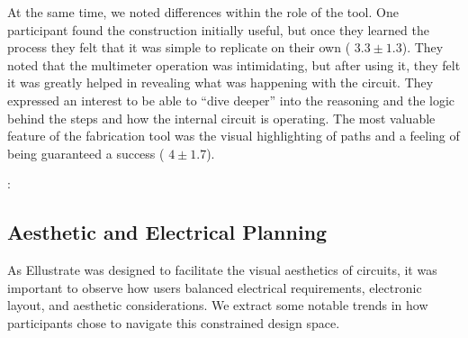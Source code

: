 \documentclass{sigchi}
\begin{document}
  At the same time, we noted differences within the role of the tool. One participant found the construction initially useful, but once they learned the process they felt that it was simple to replicate on their own ( $3.3 \pm 1.3$).   They noted that the multimeter operation was intimidating, but after using it, they felt it was greatly helped in revealing what was happening with the circuit. They expressed an interest to be able to ``dive deeper'' into the reasoning and the logic behind the steps and how the internal circuit is operating. The most valuable feature of the fabrication tool was the visual highlighting of paths and a feeling of being guaranteed a success ( $4 \pm 1.7$). 

  \begin{myquote}
   \vspace{-2pt}
    :
    \vspace{-2pt}
  \end{myquote}




% 
  

\subsection{Aesthetic and Electrical Planning}
  As Ellustrate was designed to facilitate the visual aesthetics of circuits, it was important to observe how users balanced electrical requirements, electronic layout, and  aesthetic considerations. We extract some notable trends in how participants chose to navigate this constrained design space. 


  
\end{document}
